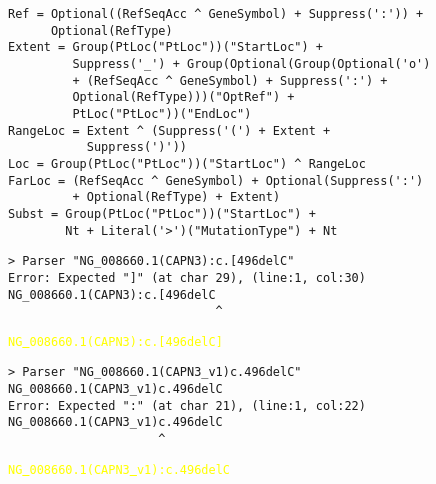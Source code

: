 \documentclass[a4, portrait]{seminar}
\providecommand{\mspace}{\vspace{0.5cm}}
\begin{document}
\begin{slide}
\begin{verbatim}
Ref = Optional((RefSeqAcc ^ GeneSymbol) + Suppress(':')) + 
      Optional(RefType)
Extent = Group(PtLoc("PtLoc"))("StartLoc") + 
         Suppress('_') + Group(Optional(Group(Optional('o') 
         + (RefSeqAcc ^ GeneSymbol) + Suppress(':') + 
         Optional(RefType)))("OptRef") + 
         PtLoc("PtLoc"))("EndLoc")
RangeLoc = Extent ^ (Suppress('(') + Extent + 
           Suppress(')'))
Loc = Group(PtLoc("PtLoc"))("StartLoc") ^ RangeLoc
FarLoc = (RefSeqAcc ^ GeneSymbol) + Optional(Suppress(':') 
         + Optional(RefType) + Extent)
Subst = Group(PtLoc("PtLoc"))("StartLoc") +
        Nt + Literal('>')("MutationType") + Nt
\end{verbatim}
\vfill
\end{slide}

\begin{slide}
\begin{verbatim}
> Parser "NG_008660.1(CAPN3):c.[496delC"
Error: Expected "]" (at char 29), (line:1, col:30)
NG_008660.1(CAPN3):c.[496delC
                             ^
\end{verbatim}
\vspace{-.5cm}
\textcolor{yellow}{\tt{NG\underline{\ }008660.1(CAPN3):c.[496delC]}}
\mspace

\begin{verbatim}
> Parser "NG_008660.1(CAPN3_v1)c.496delC"
NG_008660.1(CAPN3_v1)c.496delC
Error: Expected ":" (at char 21), (line:1, col:22)
NG_008660.1(CAPN3_v1)c.496delC
                     ^
\end{verbatim}
\vspace{-.5cm}
\textcolor{yellow}{\tt{NG\underline{\ }008660.1(CAPN3\underline{\ }v1):c.496delC}}
\vfill
\end{slide}
\end{document}
